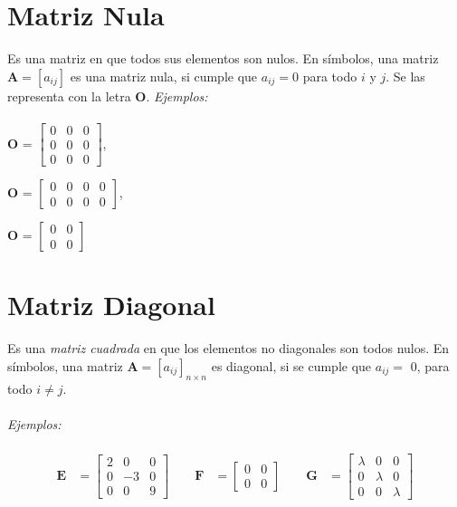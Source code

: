 \documentclass[a4paper,12pt]{report} %
\begin{document}
\section{Matriz Nula}
Es una matriz en que todos sus elementos son nulos. En símbolos, una matriz \(\mathbf{A} = \left[ a_{ij} \right]\) es una matriz nula, si cumple que \(a_{ij} = 0\) para todo \(i\) y \(j\).  
Se las representa con la letra \(\mathbf{O}\).
\newpage
\textit{Ejemplos:} \\ \\
\textbf{O} =
$\begin{bmatrix}
0 & 0 & 0 \\
0 & 0 & 0 \\
0 & 0 & 0
\end{bmatrix}$,\\
\vspace{0.5cm}

\textbf{O} =
$\begin{bmatrix}
0 & 0 & 0 & 0\\
0 & 0 & 0 & 0
\end{bmatrix}$,\\
\vspace{0.5cm}

\textbf{O} =
$\begin{bmatrix}
0 & 0 \\
0 & 0
\end{bmatrix}$\\

\section{Matriz Diagonal}

Es una \textit{matriz cuadrada} en que los elementos no diagonales son todos nulos. En símbolos, una matriz \(\mathbf{A} = \left[ a_{ij} \right]_\mathit{n\times n}\) es diagonal, si se cumple que \(\mathit{a_{ij}=}\) 0, para todo \(\mathit{i\neq j}\).\\ \\
\textit{Ejemplos:}\\ \\  
\[
\begin{aligned}
\mathbf{E} &= \begin{bmatrix}
    2 & 0 & 0 \\
    0 & -3 & 0 \\
    0 & 0 & 9
\end{bmatrix}
\qquad
\mathbf{F} &= \begin{bmatrix}
    0 & 0 \\
    0 & 0
\end{bmatrix}
\qquad
\mathbf{G} &= \begin{bmatrix}
    \lambda  & 0 & 0 \\
    0 & \lambda & 0 \\
    0 & 0 & \lambda
\end{bmatrix}
\end{aligned}
\]
\\
\end{document}
